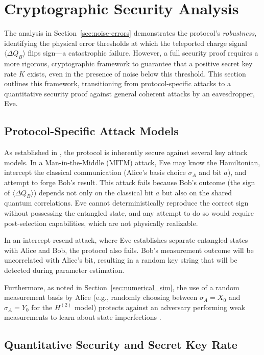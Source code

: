 \section{Cryptographic Security Analysis}
\label{sec:security_analysis}

The analysis in Section~\ref{sec:noise-errors} demonstrates the protocol's \textit{robustness}, identifying the physical error thresholds at which the teleported charge signal $\langle \Delta Q_B \rangle$ flips sign---a catastrophic failure. However, a full security proof requires a more rigorous, cryptographic framework to guarantee that a positive secret key rate $K$ exists, even in the presence of noise below this threshold. This section outlines this framework, transitioning from protocol-specific attacks to a quantitative security proof against general coherent attacks by an eavesdropper, Eve.

\subsection{Protocol-Specific Attack Models}
\label{sec:attack_models}

As established in \cite{QKDbyQET}, the protocol is inherently secure against several key attack models. In a Man-in-the-Middle (MITM) attack, Eve may know the Hamiltonian, intercept the classical communication (Alice's basis choice $\sigma_A$ and bit $a$), and attempt to forge Bob's result. This attack fails because Bob's outcome (the sign of $\langle \Delta Q_B \rangle$) depends not only on the classical bit $a$ but also on the shared quantum correlations. Eve cannot deterministically reproduce the correct sign without possessing the entangled state, and any attempt to do so would require post-selection capabilities, which are not physically realizable.

In an intercept-resend attack, where Eve establishes separate entangled states with Alice and Bob, the protocol also fails. Bob's measurement outcome will be uncorrelated with Alice's bit, resulting in a random key string that will be detected during parameter estimation.

Furthermore, as noted in Section~\ref{sec:numerical_sim}, the use of a random measurement basis by Alice (e.g., randomly choosing between $\sigma_A = X_0$ and $\sigma_A = Y_0$ for the $H^{(2)}$ model) protects against an adversary performing weak measurements to learn about state imperfections \cite{QKDbyQET}.

\subsection{Quantitative Security and Secret Key Rate}
\label{sec:key_rate_formula}

